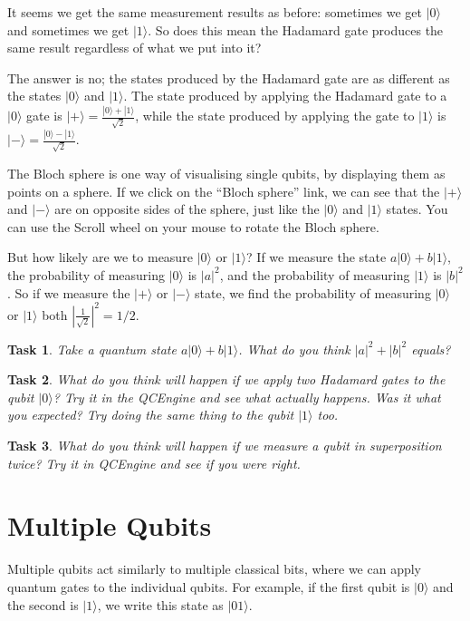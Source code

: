 \documentclass[twocolumn]{article}
\newtheorem{task}{Task}[section]
\begin{document}
It seems we get the same measurement results as before: sometimes we get $|0\rangle$ and sometimes we get $|1\rangle$. So does this mean the Hadamard gate produces the same result regardless of what we put into it?

The answer is no; the states produced by the Hadamard gate are as different as the states $|0\rangle$ and $|1\rangle$. The state produced by applying the Hadamard gate to a $|0\rangle$ gate is $|+\rangle = \frac{|0\rangle + |1\rangle}{\sqrt{2}}$, while the state produced by applying the gate to $|1\rangle$ is $|-\rangle = \frac{|0\rangle - |1\rangle}{\sqrt{2}}$.

The Bloch sphere is one way of visualising single qubits, by displaying them as points on a sphere. If we click on the ``Bloch sphere'' link, we can see that the $|+\rangle$ and $|-\rangle$ are on opposite sides of the sphere, just like the $|0\rangle$ and $|1\rangle$ states. You can use the Scroll wheel on your mouse to rotate the Bloch sphere.

But how likely are we to measure $|0\rangle$ or $|1\rangle$? If we measure the state $a|0\rangle + b|1\rangle$, the probability of measuring $|0\rangle$ is $|a|^2$, and the probability of measuring $|1\rangle$ is $|b|^2$. So if we measure the $|+\rangle$ or $|-\rangle$ state, we find the probability of measuring $|0\rangle$ or $|1\rangle$ both $\left|\frac{1}{\sqrt{2}}\right|^2 = 1/2$.

\begin{task}
Take a quantum state $a|0\rangle + b|1\rangle$. What do you think $|a|^2 + |b|^2$ equals?
\end{task}

\begin{task}
What do you think will happen if we apply two Hadamard gates to the qubit $|0\rangle$? Try it in the QCEngine and see what actually happens. Was it what you expected? Try doing the same thing to the qubit $|1\rangle$ too.
\end{task}

\begin{task}
What do you think will happen if we measure a qubit in superposition twice? Try it in QCEngine and see if you were right.
\end{task}

\section{Multiple Qubits}

Multiple qubits act similarly to multiple classical bits, where we can apply quantum gates to the individual qubits. For example, if the first qubit is $|0\rangle$ and the second is $|1\rangle$, we write this state as $|01\rangle$.
\end{document}
